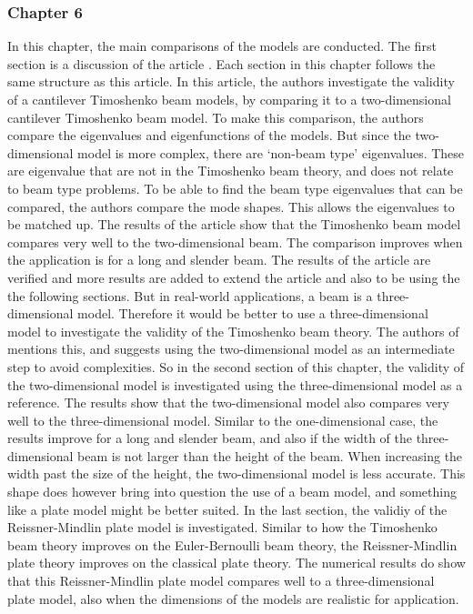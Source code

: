 \documentclass[../main.tex]{subfiles}
\begin{document}
\subsubsection{Chapter 6}
In this chapter, the main comparisons of the models are conducted. The first section is a discussion of the article \cite{LVV09}. Each section in this chapter follows the same structure as this article. In this article, the authors investigate the validity of a cantilever Timoshenko beam models, by comparing it to a two-dimensional cantilever Timoshenko beam model. To make this comparison, the authors compare the eigenvalues and eigenfunctions of the models. But since the two-dimensional model is more complex, there are `non-beam type' eigenvalues. These are eigenvalue that are not in the Timoshenko beam theory, and does not relate to beam type problems. To be able to find the beam type eigenvalues that can be compared, the authors compare the mode shapes. This allows the eigenvalues to be matched up. The results of the article show that the Timoshenko beam model compares very well to the two-dimensional beam. The comparison improves when the application is for a long and slender beam. The results of the article are verified and more results are added to extend the article and also to be using the the following sections. But in real-world applications, a beam is a three-dimensional model. Therefore it would be better to use a three-dimensional model to investigate the validity of the Timoshenko beam theory. The authors of \cite{LVV09} mentions this, and suggests using the two-dimensional model as an intermediate step to avoid complexities. So in the second section of this chapter, the validity of the two-dimensional model is investigated using the three-dimensional model as a reference. The results show that the two-dimensional model also compares very well to the three-dimensional model. Similar to the one-dimensional case, the results improve for a long and slender beam, and also if the width of the three-dimensional beam is not larger than the height of the beam. When increasing the width past the size of the height, the two-dimensional model is less accurate. This shape does however bring into question the use of a beam model, and something like a plate model might be better suited. In the last section, the validiy of the Reissner-Mindlin plate model is investigated. Similar to how the Timoshenko beam theory improves on the Euler-Bernoulli beam theory, the Reissner-Mindlin plate theory improves on the classical plate theory. The numerical results do show that this Reissner-Mindlin plate model compares well to a three-dimensional plate model, also when the dimensions of the models are realistic for application.
\end{document}
